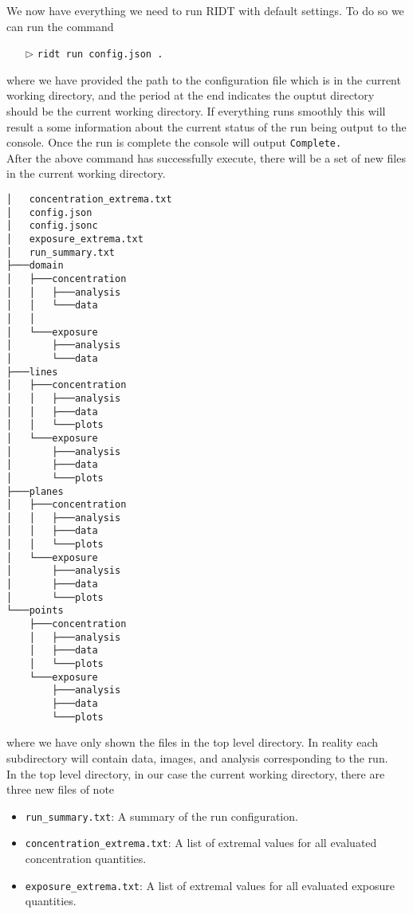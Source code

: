 \documentclass[]{article}
\def\code#1{\texttt{#1}}
\begin{document}
\noindent We now have everything we need to run RIDT with default settings. To
do so we can run the command 
\begin{itemize}
    \item[$\triangleright$] \code{ridt run config.json .}
\end{itemize}

\noindent where we have provided the path to the configuration file which is in
the current working directory, and the period at the end indicates the ouptut
directory should be the current working directory. If everything runs smoothly
this will result a some information about the current status of the run being
output to the console. Once the run is complete the console will output
\code{Complete.}\\

\noindent After the above command has successfully execute, there will be a set
of new files in the current working directory.

\begin{verbatim}
│   concentration_extrema.txt
│   config.json
│   config.jsonc
│   exposure_extrema.txt
│   run_summary.txt
├───domain
│   ├───concentration
│   │   ├───analysis
│   │   └───data
│   │
│   └───exposure
│       ├───analysis
│       └───data
├───lines
│   ├───concentration
│   │   ├───analysis
│   │   ├───data
│   │   └───plots
│   └───exposure
│       ├───analysis
│       ├───data
│       └───plots
├───planes
│   ├───concentration
│   │   ├───analysis
│   │   ├───data
│   │   └───plots
│   └───exposure
│       ├───analysis
│       ├───data
│       └───plots
└───points
    ├───concentration
    │   ├───analysis
    │   ├───data
    │   └───plots
    └───exposure
        ├───analysis
        ├───data
        └───plots
\end{verbatim}

\noindent where we have only shown the files in the top level directory. In
reality each subdirectory will contain data, images, and analysis corresponding
to the run.\\

\noindent In the top level directory, in our case the current working directory,
there are three new files of note
\begin{itemize}
    \item \code{run\_summary.txt}: A summary of the run configuration.
    \item \code{concentration\_extrema.txt}: A list of extremal values for all
    evaluated concentration quantities.
    \item \code{exposure\_extrema.txt}: A list of extremal values for all
    evaluated exposure quantities.
\end{itemize}
\end{document}
